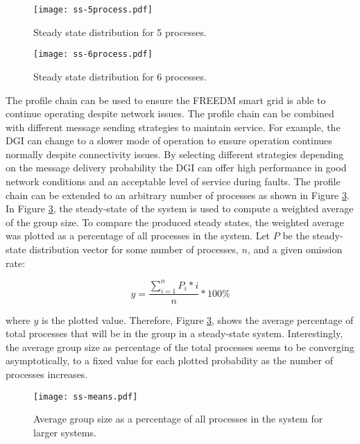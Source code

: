 \begin{figure}
    \centering
    \texttt{[image: ss-5process.pdf]}
    \caption{Steady state distribution for 5 processes.}
    \label{fig:ss-5process}
\end{figure}

\begin{figure}
    \centering
    \texttt{[image: ss-6process.pdf]}
    \caption{Steady state distribution for 6 processes.}
    \label{fig:ss-6process}
\end{figure}

The profile chain can be used to ensure the FREEDM smart grid is able to continue operating despite network issues.
The profile chain can be combined with different message sending strategies to maintain service.
For example, the DGI can change to a slower mode of operation to ensure operation continues normally despite connectivity issues.
By selecting different strategies depending on the message delivery probability the DGI can offer high performance in good network conditions and an acceptable level of service during faults.
The profile chain can be extended to an arbitrary number of processes as shown in Figure \ref{fig:ss-means}.
In Figure \ref{fig:ss-means}, the steady-state of the system is used to compute a weighted average of the group size.
To compare the produced steady states, the weighted average was plotted as a percentage of all processes in the system.
Let $P$ be the steady-state distribution vector for some number of processes, $n$, and a given omission rate:

\begin{equation} y = \frac{\sum_{i=1}^{n} P_{i}*i}{n} * 100\% \end{equation}

where $y$ is the plotted value.
Therefore, Figure \ref{fig:ss-means}, shows the average percentage of total processes that will be in the group in a steady-state system.
Interestingly, the average group size as percentage of the total processes seems to be converging asymptotically, to a fixed value for each plotted probability as the number of processes increases.

\begin{figure}
    \centering
    \texttt{[image: ss-means.pdf]}
    \caption{Average group size as a percentage of all processes in the system for larger systems.}
    \label{fig:ss-means}
\end{figure}

